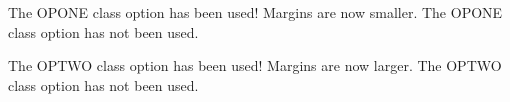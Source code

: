 \documentclass[OPONE]{template}
\begin{document}

{The OPONE class option has been used! Margins are now smaller.}
{The OPONE class option has not been used.}

{The OPTWO class option has been used! Margins are now larger.}
{The OPTWO class option has not been used.}

\end{document}
